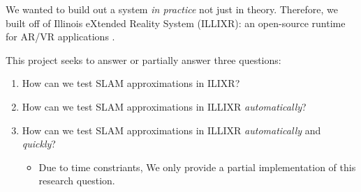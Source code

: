 We wanted to build out a system \textit{in practice} not just in theory. Therefore, we built off of Illinois eXtended Reality System (ILLIXR): an open-source runtime for AR/VR applications .

This project seeks to answer or partially answer three questions:

\begin{enumerate}[label={\textbf{R.Q. {\theenumi}}}]
\item How can we test SLAM approximations in ILIXR?
\item How can we test SLAM approximations in ILLIXR \textit{automatically}?
\item How can we test SLAM approximations in ILLIXR \textit{automatically} and \textit{quickly}?
  \begin{itemize}
  \item Due to time constriants, We only provide a partial implementation of this research question.
  \end{itemize}
\end{enumerate}
